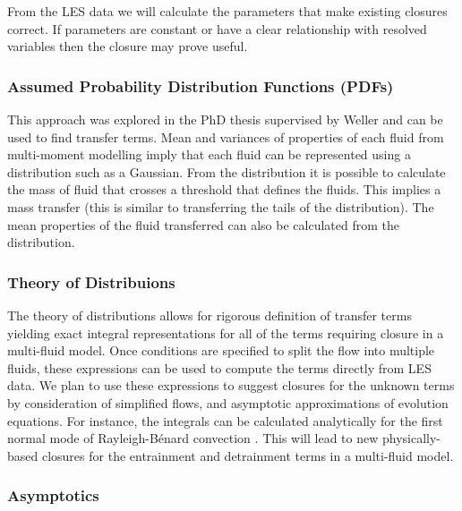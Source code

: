 \documentclass[11pt,a4paper]{article}
\begin{document}
From the LES data we will calculate the parameters that make existing closures correct. If  parameters are constant or have a clear relationship with resolved variables then the closure may prove useful.

\subsubsection*{Assumed Probability Distribution Functions (PDFs)}

This approach was explored in the PhD thesis \cite{McIn20} supervised by Weller and can be used to find transfer terms. Mean and variances of properties of each fluid from multi-moment modelling imply that each fluid can be represented using a distribution such as a Gaussian. From the distribution it is possible to calculate the mass of fluid that crosses a threshold that defines the fluids. This implies a mass transfer (this is similar to transferring the tails of the distribution). The mean properties of the fluid transferred can also be calculated from the distribution. 

\subsubsection*{Theory of Distribuions}

The theory of distributions allows for rigorous definition of transfer terms yielding exact integral representations for all of the terms requiring closure in a multi-fluid model. Once conditions are specified to split the flow into multiple fluids, these expressions can be used to compute the terms directly from LES data. We plan to use these expressions to suggest closures for the unknown terms by consideration of simplified flows, and asymptotic approximations of evolution equations. For instance, the integrals can be calculated analytically for the first normal mode of Rayleigh-B\'{e}nard convection  \cite[]{SWCM2x}.  This will lead to new physically-based closures for the entrainment and detrainment terms in a multi-fluid model. 

\subsubsection*{Asymptotics}
\end{document}

